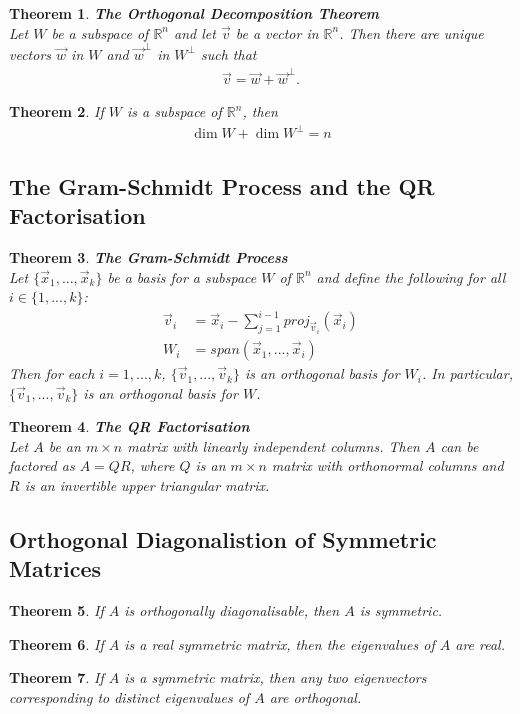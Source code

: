\documentclass{article}
\theoremstyle{sltheorem}
\newtheorem{theorem}{Theorem}[section]
\begin{document}
\begin{theorem}
    \textbf{The Orthogonal Decomposition Theorem}\\
    Let $W$ be a subspace of $\mathbb{R}^n$ and let $\vec v$ be a vector in $\mathbb{R}^n$.
    Then there are unique vectors $\vec w$ in $W$ and $\vec w^{\perp}$ in $W^{\perp}$ such that
\begin{align*}
    \vec v = \vec w + \vec w^{\perp}.
\end{align*}
\end{theorem}
\setcounter{theorem}{12}
\begin{theorem}
    If $W$ is a subspace of $\mathbb{R}^n$, then
    \begin{align*}
        \dim W + \dim W^{\perp} = n        
    \end{align*}
\end{theorem}
\setcounter{theorem}{14}
\subsection{The Gram-Schmidt Process and the QR Factorisation}
\begin{theorem}
    \textbf{The Gram-Schmidt Process}\\
    Let $\{\vec x_1, ..., \vec x_k\}$ be a basis for a subspace $W$ of $\mathbb{R}^n$ and define the following for all $i\in\{1,...,k\}$:
    \begin{align*}
        \vec v_i &= \vec x_i - \sum^{i-1}_{j=1} proj_{\vec v_i}(\vec x_i)\\
        W_i &= span(\vec x_1, ..., \vec x_i)
    \end{align*}
    Then for each $i=1, ..., k$, $\{\vec v_1, ..., \vec v_k\}$ is an orthogonal basis for $W_i$. In particular, $\{\vec v_1, ..., \vec v_k\}$ is an orthogonal basis for $W$.
\end{theorem}
\begin{theorem}
    \textbf{The QR Factorisation}\\
    Let $A$ be an $m\times n$ matrix with linearly independent columns. Then $A$ can be factored as $A=QR$, where $Q$ is an $m\times n$ matrix with orthonormal columns and $R$ is an invertible upper triangular matrix.
\end{theorem}
\subsection{Orthogonal Diagonalistion of Symmetric Matrices}
\begin{theorem}
    If $A$ is orthogonally diagonalisable, then $A$ is symmetric.
\end{theorem}
\begin{theorem}
    If $A$ is a real symmetric matrix, then the eigenvalues of $A$ are real.
\end{theorem}
\begin{theorem}
    If $A$ is a symmetric matrix, then any two eigenvectors corresponding to distinct eigenvalues of $A$ are orthogonal.
\end{theorem}
\end{document}
